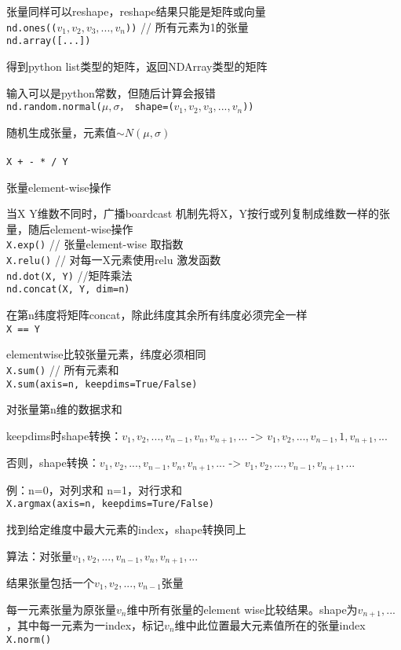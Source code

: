 \documentclass[UTF8]{ctexart}
\begin{document}
  张量同样可以reshape，reshape结果只能是矩阵或向量\\
\texttt{nd.ones(($v_1, v_2, v_3, ..., v_n$))} // 所有元素为1的张量\\
\texttt{nd.array([...])}
 
  得到python list类型的矩阵，返回NDArray类型的矩阵
  
  输入可以是python常数，但随后计算会报错\\
\texttt{nd.random.normal($\mu, \sigma$， shape=($v_1, v_2, v_3, ..., v_n$))}

  随机生成张量，元素值$\sim N(\mu, \sigma)$\\\\
\texttt{X + - * / Y}

  张量element-wise操作
  
  当X Y维数不同时，广播boardcast 机制先将X，Y按行或列复制成维数一样的张量，随后element-wise操作\\
\texttt{X.exp()} // 张量element-wise 取指数\\
\texttt{X.relu()} // 对每一X元素使用relu 激发函数\\
\texttt{nd.dot(X, Y)} //矩阵乘法\\
\texttt{nd.concat(X, Y, dim=n)}

  在第n纬度将矩阵concat，除此纬度其余所有纬度必须完全一样\\
\texttt{X == Y} 

  elementwise比较张量元素，纬度必须相同\\
\texttt{X.sum()} // 所有元素和\\
\texttt{X.sum(axis=n, keepdims=True/False)}

  对张量第n维的数据求和
  
  keepdims时shape转换：$v_1, v_2, ..., v_{n-1}, v_n, v_{n+1}, ...$ -> $v_1, v_2, ..., v_{n-1}, 1, v_{n+1}, ...$

  否则，shape转换：$v_1, v_2, ..., v_{n-1}, v_n, v_{n+1}, ...$ -> $v_1, v_2, ..., v_{n-1}, v_{n+1}, ...$

  例：n=0，对列求和 n=1，对行求和\\
\texttt{X.argmax(axis=n, keepdims=Ture/False)}
  
  找到给定维度中最大元素的index，shape转换同上

  算法：对张量$v_1, v_2, ..., v_{n-1}, v_n, v_{n+1}, ...$

  \quad 结果张量包括一个$v_1, v_2, ..., v_{n-1}$张量

  \quad 每一元素张量为原张量$v_n$维中所有张量的element wise比较结果。shape为$v_{n+1}, ...$，其中每一元素为一index，标记$v_n$维中此位置最大元素值所在的张量index\\
\texttt{X.norm()}
 
\end{document}
